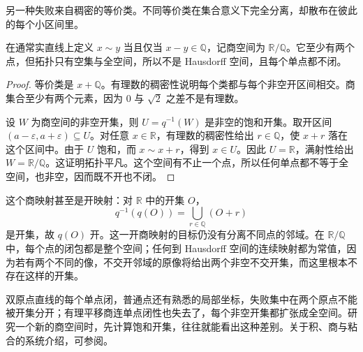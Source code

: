 另一种失败来自稠密的等价类。不同等价类在集合意义下完全分离，却散布在彼此的每个小区间里。

\begin{example}\label{g1:exm:rational-orbit-quotient}
	在通常实直线上定义 \(x\sim y\) 当且仅当 \(x-y\in\mathbb Q\)，记商空间为 \(\mathbb R/\mathbb Q\)。它至少有两个点，但拓扑只有空集与全空间，所以不是 Hausdorff 空间，且每个单点都不闭。
\end{example}
\begin{proof}
	等价类是 \(x+\mathbb Q\)。有理数的稠密性说明每个类都与每个非空开区间相交。商集合至少有两个元素，因为 \(0\) 与 \(\sqrt2\) 之差不是有理数。

	设 \(W\) 为商空间的非空开集，则 \(U=q^{-1}(W)\) 是非空的饱和开集。取开区间 \((a-\varepsilon,a+\varepsilon)\subseteq U\)。对任意 \(x\in\mathbb R\)，有理数的稠密性给出 \(r\in\mathbb Q\)，使 \(x+r\) 落在这个区间中。由于 \(U\) 饱和，而 \(x\sim x+r\)，得到 \(x\in U\)。因此 \(U=\mathbb R\)，满射性给出 \(W=\mathbb R/\mathbb Q\)。这证明拓扑平凡。这个空间有不止一个点，所以任何单点都不等于全空间，也非空，因而既不开也不闭。
\end{proof}

这个商映射甚至是开映射：对 \(\mathbb R\) 中的开集 \(O\)，
\[
	q^{-1}(q(O))=\bigcup_{r\in\mathbb Q}(O+r)
\]
是开集，故 \(q(O)\) 开。这一开商映射的目标仍没有分离不同点的邻域。在 \(\mathbb R/\mathbb Q\) 中，每个点的闭包都是整个空间；任何到 Hausdorff 空间的连续映射都为常值，因为若有两个不同的像，不交开邻域的原像将给出两个非空不交开集，而这里根本不存在这样的开集。

双原点直线的每个单点闭，普通点还有熟悉的局部坐标，失败集中在两个原点不能被开集分开；有理平移商连单点闭性也失去了，每个非空开集都扩张成全空间。研究一个新的商空间时，先计算饱和开集，往往就能看出这种差别。关于积、商与粘合的系统介绍，可参阅\cite[第3章, Product Spaces, 第60页; Quotient Spaces, 第65页; Adjunction Spaces, 第73页]{Lee2011Topological}。
